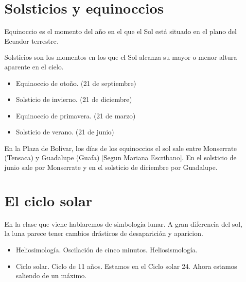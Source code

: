 \documentclass{report}
\begin{document}
\section*{Solsticios y equinoccios}

Equinoccio es el momento del a\~no en el que el Sol est\'a situado en
el plano del Ecuador terrestre.

Solsticios son los momentos en los que el Sol alcanza su mayor o menor
altura aparente en el cielo.

\begin{itemize}
\item Equinoccio de oto\~no. (21 de septiembre)
\item Solsticio de invierno. (21 de diciembre)
\item Equinoccio de primavera. (21 de marzo)
\item Solsticio de verano. (21 de junio)
\end{itemize}

En la Plaza de Bolivar, los d\'ias de los equinoccios el sol sale
entre Monserrate (Tensaca) y Guadalupe (Guafa) [Segun Mariana
  Escribano]. En el solsticio de junio sale por Monserrate y en el
solsticio de diciembre por Guadalupe. 

\section*{El ciclo solar}
En la clase que viene hablaremos de simbologia lunar. A gran
diferencia del sol, la luna parece tener cambios dr\'asticos de
desaparici\'on y aparicion.

\begin{itemize}
\item Heliosimolog\'ia. Oscilaci\'on de cinco minutos. Heliosismolog\'ia.
\item Ciclo solar. Ciclo de 11 a\~nos. Estamos en el Ciclo solar
  24. Ahora estamos saliendo de un
  m\'aximo. 

\end{itemize}
\end{document}
